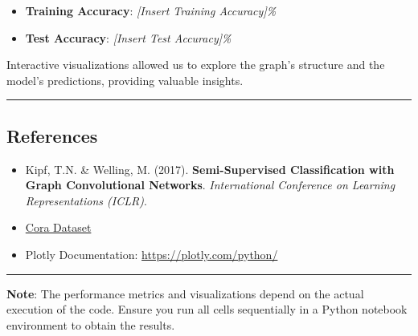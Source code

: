 \documentclass[11pt]{article}
\providecommand{\tightlist}{%
      \setlength{\itemsep}{0pt}\setlength{\parskip}{0pt}}
\begin{document}
\begin{itemize}
\tightlist
\item
  \textbf{Training Accuracy}: \emph{{[}Insert Training Accuracy{]}\%}
\item
  \textbf{Test Accuracy}: \emph{{[}Insert Test Accuracy{]}\%}
\end{itemize}

Interactive visualizations allowed us to explore the graph's structure
and the model's predictions, providing valuable insights.

\begin{center}\rule{0.5\linewidth}{0.5pt}\end{center}

\subsection{References}\label{references}

\begin{itemize}
\tightlist
\item
  Kipf, T.N. \& Welling, M. (2017). \textbf{Semi-Supervised
  Classification with Graph Convolutional Networks}. \emph{International
  Conference on Learning Representations (ICLR)}.
\item
  \href{https://linqs.soe.ucsc.edu/data}{Cora Dataset}
\item
  Plotly Documentation: \url{https://plotly.com/python/}
\end{itemize}

\begin{center}\rule{0.5\linewidth}{0.5pt}\end{center}

\textbf{Note}: The performance metrics and visualizations depend on the
actual execution of the code. Ensure you run all cells sequentially in a
Python notebook environment to obtain the results.


    
    
    
\end{document}
